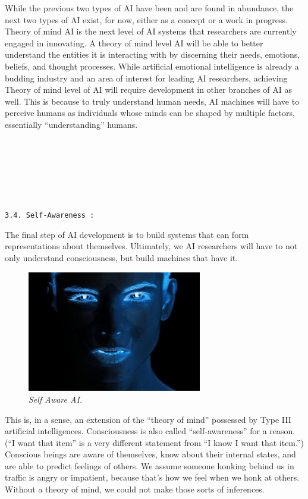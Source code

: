 \documentclass{article}
\begin{document}
While the previous two types of AI have been and are found in abundance, the next two types of AI exist, for now, either as a concept or a work in progress. Theory of mind AI is the next level of AI systems that researchers are currently engaged in innovating. A theory of mind level AI will be able to better understand the entities it is interacting with by discerning their needs, emotions, beliefs, and thought processes. While artificial emotional intelligence is already a budding industry and an area of interest for leading AI researchers, achieving Theory of mind level of AI will require development in other branches of AI as well. This is because to truly understand human needs, AI machines will have to perceive humans as individuals whose minds can be shaped by multiple factors, essentially “understanding” humans.\\\\\\\\\\\\\\

\begin{large}
\texttt{3.4. Self-Awareness :}
\end{large}

The final step of AI development is to build systems that can form representations about themselves. Ultimately, we AI researchers will have to not only understand consciousness, but build machines that have it.

\begin{figure}
\centering
\includegraphics[width=3in]{Self-Aware-AI-Types-Of-Artificial-Intelligence}
\caption{\textit{Self Aware AI.}}
\end{figure}

This is, in a sense, an extension of the “theory of mind” possessed by Type III artificial intelligences. Consciousness is also called “self-awareness” for a reason. (“I want that item” is a very different statement from “I know I want that item.”) Conscious beings are aware of themselves, know about their internal states, and are able to predict feelings of others. We assume someone honking behind us in traffic is angry or impatient, because that’s how we feel when we honk at others. Without a theory of mind, we could not make those sorts of inferences.
\end{document}
